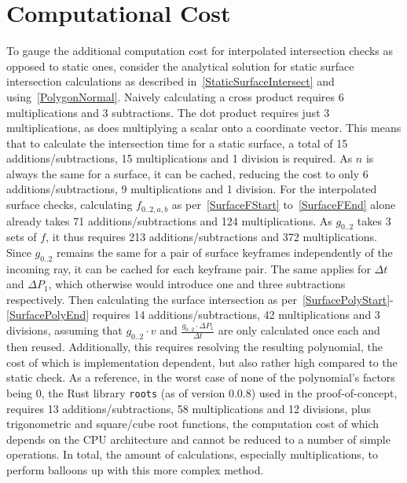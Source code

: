 \section{Computational Cost}

To gauge the additional computation cost for interpolated intersection checks as opposed to static ones,
consider the analytical solution for static surface intersection calculations as described in~\eqref{StaticSurfaceIntersect}
and using~\eqref{PolygonNormal}.
\newline
Naively calculating a cross product requires 6 multiplications and 3 subtractions.
The dot product requires just 3 multiplications, as does multiplying a scalar onto a coordinate vector.
This means that to calculate the intersection time for a static surface,
a total of 15 additions/subtractions, 15 multiplications and 1 division is required.
As \(n\) is always the same for a surface, it can be cached,
reducing the cost to only 6 additions/subtractions, 9 multiplications and 1 division.
\newline
For the interpolated surface checks, calculating \(f_{0..2, a, b}\) as per~\eqref{SurfaceFStart} to~\eqref{SurfaceFEnd}
alone already takes 71 additions/subtractions and 124 multiplications.
As \(g_{0..2}\) takes 3 sets of \(f\), it thus requires 213 additions/subtractions and 372 multiplications.
Since \(g_{0..2}\) remains the same for a pair of surface keyframes independently of the incoming ray,
it can be cached for each keyframe pair. The same applies for \(\Delta t\) and \(\Delta P_1\),
which otherwise would introduce one and three subtractions respectively.
\newline
Then calculating the surface intersection as per~\eqref{SurfacePolyStart}-\eqref{SurfacePolyEnd}
requires 14 additions/subtractions, 42 multiplications and 3 divisions,
assuming that \(g_{0..2} \cdot v\) and \(\frac{g_{0..2} \cdot \Delta P_1}{\Delta t}\)
are only calculated once each and then reused.
\newline
Additionally, this requires resolving the resulting polynomial,
the cost of which is implementation dependent, but also rather high compared to the static check.
As a reference, in the worst case of none of the polynomial's factors being 0,
the Rust library \verb|roots| (as of version 0.0.8) used in the proof-of-concept, requires 13 additions/subtractions,
58 multiplications and 12 divisions, plus trigonometric and square/cube root functions, the computation cost of which
depends on the CPU architecture and cannot be reduced to a number of simple operations.
\newline
In total, the amount of calculations, especially multiplications, to perform balloons up with this more complex method.

